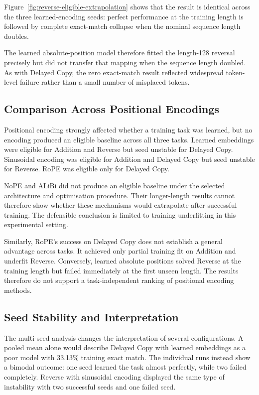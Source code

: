 \documentclass[
    author={Aanchala Ravindra Bhongade},
    supervisor={Dr. Fernando Moreno-Pino},
    degree={MSc},
    title={Length Generalisation in Transformer-Based Sequence Models: Failure Taxonomy and Mitigation Strategies},
    subtitle={},
    type={},
    year={2026}
]{dissertation}
\begin{document}
Figure~\ref{fig:reverse-eligible-extrapolation} shows that the result is identical across the three learned-encoding seeds: perfect performance at the training length is followed by complete exact-match collapse when the nominal sequence length doubles.

The learned absolute-position model therefore fitted the length-128 reversal precisely but did not transfer that mapping when the sequence length doubled. As with Delayed Copy, the zero exact-match result reflected widespread token-level failure rather than a small number of misplaced tokens.

\subsection{Comparison Across Positional Encodings}
\label{sec:positional-comparison-results}

Positional encoding strongly affected whether a training task was learned, but no encoding produced an eligible baseline across all three tasks. Learned embeddings were eligible for Addition and Reverse but seed unstable for Delayed Copy. Sinusoidal encoding was eligible for Addition and Delayed Copy but seed unstable for Reverse. RoPE was eligible only for Delayed Copy.

NoPE and ALiBi did not produce an eligible baseline under the selected architecture and optimisation procedure. Their longer-length results cannot therefore show whether these mechanisms would extrapolate after successful training. The defensible conclusion is limited to training underfitting in this experimental setting.

Similarly, RoPE's success on Delayed Copy does not establish a general advantage across tasks. It achieved only partial training fit on Addition and underfit Reverse. Conversely, learned absolute positions solved Reverse at the training length but failed immediately at the first unseen length. The results therefore do not support a task-independent ranking of positional encoding methods.

\subsection{Seed Stability and Interpretation}
\label{sec:seed-stability-results}

The multi-seed analysis changes the interpretation of several configurations. A pooled mean alone would describe Delayed Copy with learned embeddings as a poor model with 33.13\% training exact match. The individual runs instead show a bimodal outcome: one seed learned the task almost perfectly, while two
failed completely. Reverse with sinusoidal encoding displayed the same type of instability with two successful seeds and one failed seed.
\end{document}
